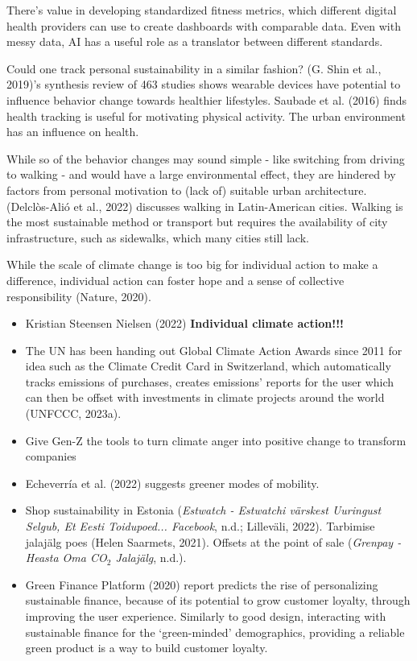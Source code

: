 \documentclass[
  letterpaper,
  DIV=11,
  numbers=noendperiod]{scrartcl}
\begin{document}
There's value in developing standardized fitness metrics, which
different digital health providers can use to create dashboards with
comparable data. Even with messy data, AI has a useful role as a
translator between different standards.

Could one track personal sustainability in a similar fashion? (G. Shin
et al., 2019)'s synthesis review of 463 studies shows wearable devices
have potential to influence behavior change towards healthier
lifestyles. Saubade et al. (2016) finds health tracking is useful for
motivating physical activity. The urban environment has an influence on
health.

While so of the behavior changes may sound simple - like switching from
driving to walking - and would have a large environmental effect, they
are hindered by factors from personal motivation to (lack of) suitable
urban architecture. (Delclòs-Alió et al., 2022) discusses walking in
Latin-American cities. Walking is the most sustainable method or
transport but requires the availability of city infrastructure, such as
sidewalks, which many cities still lack.

While the scale of climate change is too big for individual action to
make a difference, individual action can foster hope and a sense of
collective responsibility (Nature, 2020).

\begin{itemize}
\item
  Kristian Steensen Nielsen (2022) \textbf{Individual climate action!!!}
\item
  The UN has been handing out Global Climate Action Awards since 2011
  for idea such as the Climate Credit Card in Switzerland, which
  automatically tracks emissions of purchases, creates emissions'
  reports for the user which can then be offset with investments in
  climate projects around the world (UNFCCC, 2023a).
\item
  Give Gen-Z the tools to turn climate anger into positive change to
  transform companies
\item
  Echeverría et al. (2022) suggests greener modes of mobility.
\item
  Shop sustainability in Estonia (\emph{Estwatch - {Estwatchi}
  v{ä}rskest Uuringust Selgub, Et {Eesti} Toidupoed... {\textbar}
  {Facebook}}, n.d.; Lilleväli, 2022). Tarbimise jalajälg poes (Helen
  Saarmets, 2021). Offsets at the point of sale (\emph{Grenpay -
  {Heasta} Oma {CO}{\(_2\)} Jalaj{ä}lg}, n.d.).
\item
  Green Finance Platform (2020) report predicts the rise of
  personalizing sustainable finance, because of its potential to grow
  customer loyalty, through improving the user experience. Similarly to
  good design, interacting with sustainable finance for the
  `green-minded' demographics, providing a reliable green product is a
  way to build customer loyalty.
\end{itemize}
\end{document}
